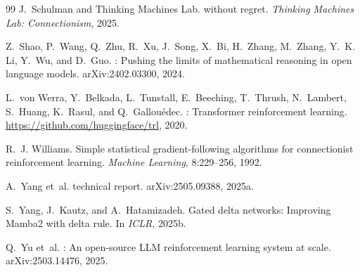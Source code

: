 \documentclass[11pt,a4paper]{article}
\begin{document}
\begin{thebibliography}{99}
J.~Schulman and Thinking Machines Lab.
 without regret.
\newblock \emph{Thinking Machines Lab: Connectionism}, 2025.

Z.~Shao, P.~Wang, Q.~Zhu, R.~Xu, J.~Song, X.~Bi, H.~Zhang, M.~Zhang,
Y.~K. Li, Y.~Wu, and D.~Guo.
: Pushing the limits of mathematical reasoning in open
language models.
\newblock arXiv:2402.03300, 2024.

L.~von Werra, Y.~Belkada, L.~Tunstall, E.~Beeching, T.~Thrush, N.~Lambert,
S.~Huang, K.~Rasul, and Q.~Gallou{\'e}dec.
: Transformer reinforcement learning.
\newblock \url{https://github.com/huggingface/trl}, 2020.

R.~J. Williams.
\newblock Simple statistical gradient-following algorithms for connectionist
reinforcement learning.
\newblock \emph{Machine Learning}, 8:229--256, 1992.

A.~Yang et~al.
 technical report.
\newblock arXiv:2505.09388, 2025a.

S.~Yang, J.~Kautz, and A.~Hatamizadeh.
\newblock Gated delta networks: Improving {Mamba2} with delta rule.
\newblock In \emph{ICLR}, 2025b.

Q.~Yu et~al.
: An open-source {LLM} reinforcement learning system at
scale.
\newblock arXiv:2503.14476, 2025.

\end{thebibliography}
\end{document}
